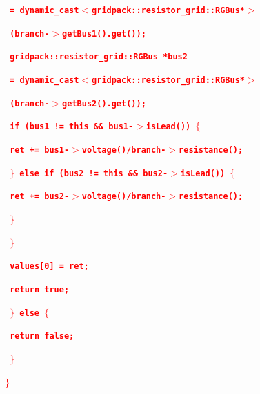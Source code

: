 \documentclass[12pt]{report} %
\begin{document}
\textcolor{red}{\texttt{\textbf{        = dynamic\_cast$\boldsymbol{\mathrm{<}}$gridpack::resistor\_grid::RGBus*$\boldsymbol{\mathrm{>}}$}}}

\textcolor{red}{\texttt{\textbf{          (branch-$\boldsymbol{\mathrm{>}}$getBus1().get());}}}

\textcolor{red}{\texttt{\textbf{      gridpack::resistor\_grid::RGBus *bus2}}}

\textcolor{red}{\texttt{\textbf{        = dynamic\_cast$\boldsymbol{\mathrm{<}}$gridpack::resistor\_grid::RGBus*$\boldsymbol{\mathrm{>}}$}}}

\textcolor{red}{\texttt{\textbf{          (branch-$\boldsymbol{\mathrm{>}}$getBus2().get());}}}

\textcolor{red}{\texttt{\textbf{      if (bus1 != this \&\& bus1-$\boldsymbol{\mathrm{>}}$isLead()) $\boldsymbol{\mathrm{\{}}$}}}

\textcolor{red}{\texttt{\textbf{        ret += bus1-$\boldsymbol{\mathrm{>}}$voltage()/branch-$\boldsymbol{\mathrm{>}}$resistance();}}}

\textcolor{red}{\texttt{\textbf{      $\boldsymbol{\mathrm{\}}}$ else if (bus2 != this \&\& bus2-$\boldsymbol{\mathrm{>}}$isLead()) $\boldsymbol{\mathrm{\{}}$}}}

\textcolor{red}{\texttt{\textbf{        ret += bus2-$\boldsymbol{\mathrm{>}}$voltage()/branch-$\boldsymbol{\mathrm{>}}$resistance();}}}

\textcolor{red}{\texttt{\textbf{      $\boldsymbol{\mathrm{\}}}$}}}

\textcolor{red}{\texttt{\textbf{    $\boldsymbol{\mathrm{\}}}$}}}

\textcolor{red}{\texttt{\textbf{    values[0] = ret;}}}

\textcolor{red}{\texttt{\textbf{    return true;}}}

\textcolor{red}{\texttt{\textbf{  $\boldsymbol{\mathrm{\}}}$ else $\boldsymbol{\mathrm{\{}}$}}}

\textcolor{red}{\texttt{\textbf{    return false;}}}

\textcolor{red}{\texttt{\textbf{  $\boldsymbol{\mathrm{\}}}$}}}

\textcolor{red}{\texttt{\textbf{$\boldsymbol{\mathrm{\}}}$}}}
\end{document}
